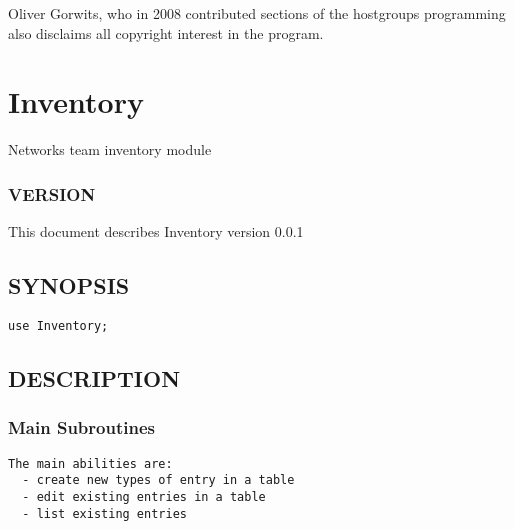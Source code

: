 \documentclass{book}
\begin{document}
Oliver Gorwits, who in 2008 contributed sections of the hostgroups programming also disclaims all copyright interest in the program.




\section{Inventory}
\label{_Inventory}
\hypertarget{_Inventory}{}



Networks team inventory module


\subsubsection{VERSION}
\label{Inventory_VERSION}
\hypertarget{Inventory_VERSION}{}



This document describes Inventory version 0.0.1


\subsection{SYNOPSIS}
\label{Inventory_SYNOPSIS}
\hypertarget{Inventory_SYNOPSIS}{}


\begin{Verbatim}[fontfamily=courier,gobble=1,frame=lines,fontsize=\small]
  use Inventory;
\end{Verbatim}


\subsection{DESCRIPTION}
\label{Inventory_DESCRIPTION}
\hypertarget{Inventory_DESCRIPTION}{}


\subsubsection{Main Subroutines}
\label{Inventory_Main_Subroutines}
\hypertarget{Inventory_Main_Subroutines}{}


\begin{Verbatim}[fontfamily=courier,gobble=1,frame=lines,fontsize=\small]
 The main abilities are:
  - create new types of entry in a table
  - edit existing entries in a table
  - list existing entries
\end{Verbatim}
\end{document}
